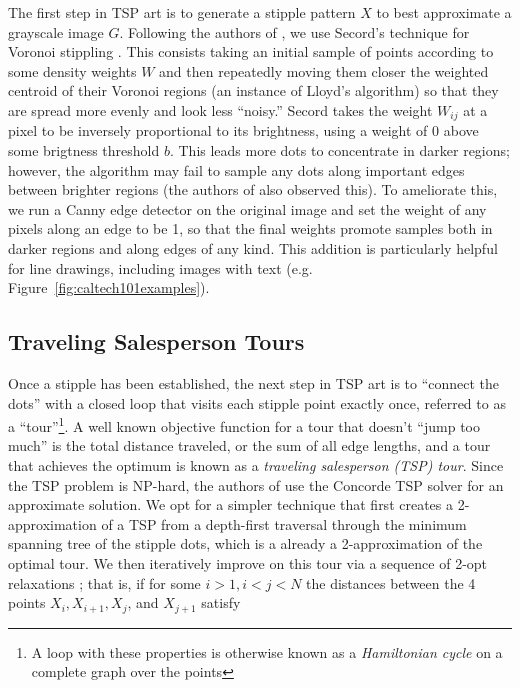 \documentclass[runningheads]{llncs}
\begin{document}
The first step in TSP art is to generate a stipple pattern $X$ to best approximate a grayscale image $G$.  Following the authors of \cite{kaplan2005tsp}, we use Secord's technique for Voronoi stippling \cite{secord2002weighted}.  This consists taking an initial sample of points according to some density weights $W$ and then repeatedly moving them closer the weighted centroid of their Voronoi regions (an instance of Lloyd's algorithm) so that they are spread more evenly and look less ``noisy.''  Secord \cite{secord2002weighted} takes the weight $W_{ij}$ at a pixel to be inversely proportional to its brightness, using a weight of $0$ above some brigtness threshold $b$.  This leads more dots to concentrate in darker regions; however, the algorithm may fail to sample any dots along important edges between brighter regions (the authors of \cite{li2011structure} also observed this).   To ameliorate this, we run a Canny edge detector \cite{canny1986computational} on the original image and set the weight of any pixels along an edge to be 1, so that the final weights promote samples both in darker regions and along edges of any kind.  This addition is particularly helpful for line drawings, including images with text (e.g. Figure~\ref{fig:caltech101examples}).  %

\subsection{Traveling Salesperson Tours}
\label{sec:tsp}
Once a stipple has been established, the next step in TSP art is to ``connect the dots'' with a closed loop that visits each stipple point exactly once, referred to as a ``tour''\footnote{A loop with these properties is otherwise known as a {\em Hamiltonian cycle} on a complete graph over the points}.  A well known objective function for a tour that doesn't ``jump too much'' is the total distance traveled, or the sum of all edge lengths, and a tour that achieves the optimum is known as a {\em traveling salesperson (TSP) tour}.  Since the TSP problem is NP-hard, the authors of  \cite{kaplan2005tsp} use the Concorde TSP solver \cite{applegate2001concorde} for an approximate solution. We opt for a simpler technique that first creates a 2-approximation of a TSP from a depth-first traversal through the minimum spanning tree of the stipple dots, which is a already a 2-approximation of the optimal tour.  We then iteratively improve on this tour via a sequence of 2-opt relaxations \cite{johnson1997traveling}; that is, if for some $i > 1, i < j < N$ the distances between the 4 points $X_i, X_{i+1}, X_j$, and $X_{j+1}$ satisfy
\end{document}
